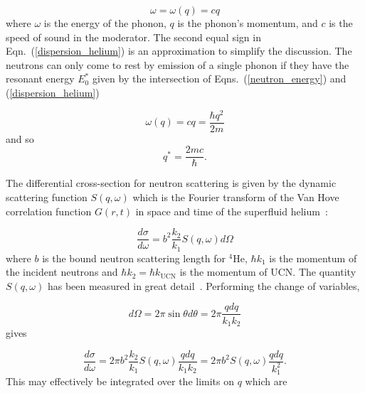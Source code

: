 \begin{equation}
\label{dispersion_helium}
\omega=\omega(q)= cq
\end{equation}
where $\omega$ is the energy of the phonon, $q$ is the phonon's
momentum, and $c$ is the speed of sound in the moderator. The second
equal sign in Eqn.~(\ref{dispersion_helium}) is an approximation to
simplify the discussion. The neutrons can only come to rest by
emission of a single phonon if they have the resonant energy $E_0^*$
given by the intersection of Eqns.~(\ref{neutron_energy}) and
(\ref{dispersion_helium})

\begin{equation}
\omega(q)=cq=\frac{\hbar q^2}{2m}
\end{equation}
and so
\begin{equation}
q^*=\frac{2mc}{\hbar}.
\end{equation}


The differential cross-section for neutron scattering is given by the
dynamic scattering function $S(q,\omega)$ which is the Fourier
transform of the Van Hove correlation function $G(r,t)$ in space and
time of the superfluid helium~\cite{Squires}:

\begin{equation}
\frac{d\sigma}{d\omega}=b^2 \frac{k_2}{k_1}S(q,\omega) d\Omega
\end{equation}
where $b$ is the bound neutron scattering length for $^4$He,
$\hbar k_1$ is the momentum of the incident neutrons and
$\hbar k_2=\hbar k_{\text{UCN}}$ is the momentum of UCN. The quantity
$S(q,\omega)$ has been measured in great
detail~\cite{S_func1,gibbs1999collective,S_func3}. Performing the
change of variables,

\begin{equation}
d\Omega=2 \pi \sin \theta d \theta = 2 \pi \frac{q dq}{k_1 k_2}
\end{equation}
gives

\begin{equation}
 \frac{d\sigma}{d\omega}=2\pi b^2 \frac{k_2}{k_1}S(q,\omega)\frac{q
   dq}{k_1 k_2}=2\pi b^2 S(q,\omega)\frac{q dq}{k_1^2}.
\end{equation}
This may effectively be integrated over the limits on $q$ which are

